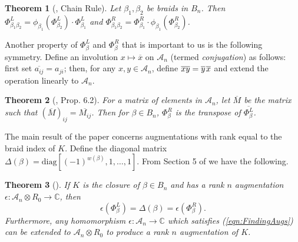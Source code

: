 \documentclass[11pt]{amsart}
\def\C{{\mathbb C}}
\def\A{{\mathcal A}}
\newtheorem{thm}{Theorem}[section]
\theoremstyle{definition}
\begin{document}
  \begin{thm}[\cite{Ng05}, Chain Rule] Let $\beta_1,\beta_2$ be braids in $B_n$. Then $\Phi_{\beta_1\beta_2}^L = \phi_{\beta_1}(\Phi_{\beta_2}^L)\cdot\Phi_{\beta_1}^L$ and $\Phi_{\beta_1\beta_2}^R = \Phi_{\beta_1}^R\cdot\phi_{\beta_1}(\Phi_{\beta_2}^R)$.
  \label{thm:ChainRule}
  \end{thm}

  Another property of $\Phi_\beta^L$ and $\Phi_\beta^R$ that is important to us is the following symmetry. Define an involution $x\mapsto\overline x$ on $\A_n$ (termed \emph{conjugation}) as follows: first set $\overline{a_{ij}}=a_{ji}$; then, for any $x,y\in\A_n$, define $\overline{xy}=\overline y\hspace*{1pt}\overline x$ and extend the operation linearly to $\A_n$.

  \begin{thm}[\cite{Ng05}, Prop.\hspace*{-0.7pt} 6.2]For a matrix of elements in $\A_n$, let $\overline{M}$ be the matrix such that $\left(\overline M\right)_{ij} = \overline{M_{ij}}$. Then for $\beta\in B_n$, $\Phi_\beta^R$ is the transpose of $\overline{\Phi_\beta^L}$.
  \label{thm:Transpose}
  \end{thm}

  The main result of the paper concerns augmentations with rank equal to the braid index of $K$. Define the diagonal matrix $\Delta(\beta)=\text{diag}[(-1)^{w(\beta)},1,\ldots,1]$. From Section 5 of \cite{Cor13a} we have the following.

  \begin{thm}[\cite{Cor13a}] If $K$ is the closure of $\beta\in B_n$ and has a rank $n$ augmentation $\epsilon:\A_n\otimes R_0\to\C$, then 
    \begin{equation}
    \epsilon(\Phi_\beta^L)=\Delta(\beta)=\epsilon(\Phi_\beta^R).
    \label{eqn:FindingAugs}
    \end{equation}
    Furthermore, any homomorphism $\epsilon:\A_n\to\C$ which satisfies (\ref{eqn:FindingAugs}) can be extended to $\A_n\otimes R_0$ to produce a rank $n$ augmentation of $K$. 
  \label{thm:RanknAugs}
  \end{thm}

\end{document}
